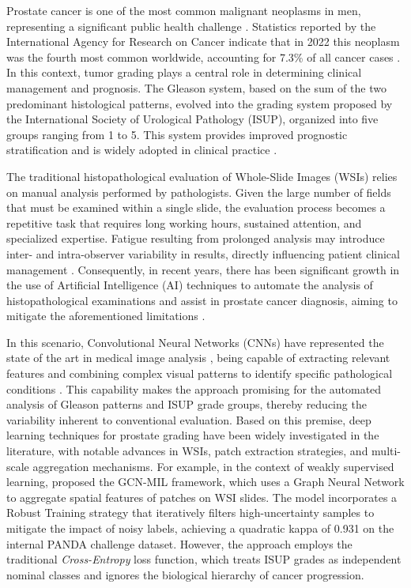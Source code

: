 Prostate cancer is one of the most common malignant neoplasms in men, representing a significant public health challenge \cite{ref_siegel2024}. Statistics reported by the International Agency for Research on Cancer indicate that in 2022 this neoplasm was the fourth most common worldwide, accounting for 7.3\% of all cancer cases \cite{JournalStatistic2024}. In this context, tumor grading plays a central role in determining clinical management and prognosis. The Gleason system, based on the sum of the two predominant histological patterns, evolved into the grading system proposed by the International Society of Urological Pathology (ISUP), organized into five groups ranging from 1 to 5. This system provides improved prognostic stratification and is widely adopted in clinical practice \cite{ref-epstein2016}.

The traditional histopathological evaluation of Whole-Slide Images (WSIs) relies on manual analysis performed by pathologists. Given the large number of fields that must be examined within a single slide, the evaluation process becomes a repetitive task that requires long working hours, sustained attention, and specialized expertise. Fatigue resulting from prolonged analysis may introduce inter- and intra-observer variability in results, directly influencing patient clinical management \cite{ref-bulten2020}. Consequently, in recent years, there has been significant growth in the use of Artificial Intelligence (AI) techniques to automate the analysis of histopathological examinations and assist in prostate cancer diagnosis, aiming to mitigate the aforementioned limitations \cite{expert2022review}.

In this scenario, Convolutional Neural Networks (CNNs) have represented the state of the art in medical image analysis \cite{ref-campanella2019}, being capable of extracting relevant features and combining complex visual patterns to identify specific pathological conditions \cite{araujo2021active}. This capability makes the approach promising for the automated analysis of Gleason patterns and ISUP grade groups, thereby reducing the variability inherent to conventional evaluation. Based on this premise, deep learning techniques for prostate grading have been widely investigated in the literature, with notable advances in WSIs, patch extraction strategies, and multi-scale aggregation mechanisms. For example, in the context of weakly supervised learning, \cite{Xiang2023Prostate} proposed the GCN-MIL framework, which uses a Graph Neural Network to aggregate spatial features of patches on WSI slides. The model incorporates a Robust Training strategy that iteratively filters high-uncertainty samples to mitigate the impact of noisy labels, achieving a quadratic kappa of 0.931 on the internal PANDA challenge dataset. However, the approach employs the traditional \textit{Cross-Entropy} loss function, which treats ISUP grades as independent nominal classes and ignores the biological hierarchy of cancer progression.

